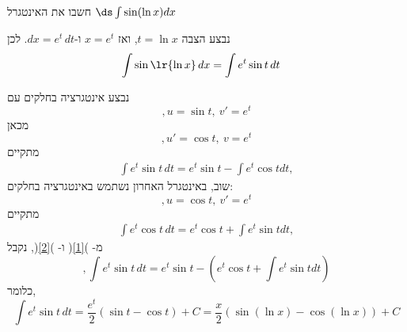 חשבו את האינטגרל
$\ds \int \sin(\ln x)dx$
\begin{solbox}
נבצע הצבה $t=\ln x$, ואז $x=e^t$ ו-$dx=e^t\,dt$.
לכן
\begin{align*}
\int \sin\lr{\ln x}\,dx
&=\int e^t\sin t\,dt
\end{align*}

נבצע אינטגרציה בחלקים עם
$$,u=\sin t,\ v'=e^t$$
מכאן
$$,u'=\cos t,\ v=e^t$$
מתקיים
\begin{align}\label{1}
\int e^t\sin t\,dt=e^t\sin t-\int e^t\cos tdt,
\end{align}
שוב, באינטגרל האחרון נשתמש באינטגרציה בחלקים:
$$,u=\cos t,\ v'=e^t$$
מתקיים
\begin{align}\label{2}
\int e^t\cos t\,dt=e^t\cos t+\int e^t\sin tdt,
\end{align}
מ-
)\ref{1}(
ו-
)\ref{2}(,
נקבל
$$,\int e^t\sin t\,dt=e^t\sin t-\left(e^t\cos t+\int e^t\sin tdt\right)$$
כלומר,
$$\int e^t\sin t\,dt=\frac{e^t}{2}(\sin t-\cos t)+C=\frac{x}{2}\left(\sin(\ln x)-\cos(\ln x)\right)+C$$
\end{solbox}
